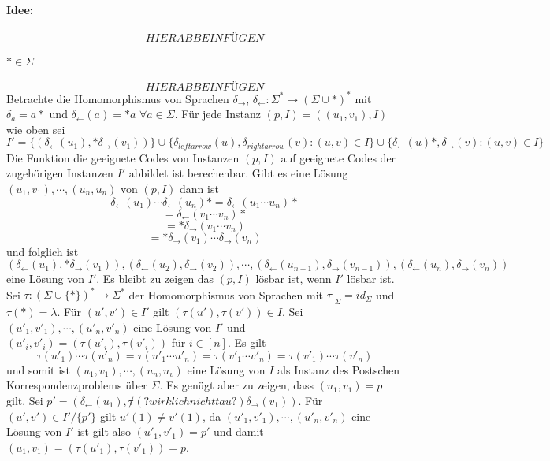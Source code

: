     \paragraph{Idee: }
    \[
    HIER ABB EINFÜGEN  
    \]

    \paragraph{\(* \in \Sigma\)}
    \[
    HIER ABB EINFÜGEN  
    \]
    Betrachte die Homomorphismus von Sprachen \(\delta_{\rightarrow}\), \(\delta_{\leftarrow} : \Sigma^* \rightarrow (\Sigma \cup {*})^*\) mit \(\delta_{a} = a*\) und \(\delta_{\leftarrow}(a) = *a\) \(\forall a \in \Sigma\). Für jede Instanz \((p, I) = ((u_1, v_1), I)\) wie oben sei \[I' = \{(\delta_{\leftarrow}(u_1), *\delta_{\rightarrow}(v_1))\} \cup \{\delta_{leftarrow}(u), \delta_{rightarrow}(v):  (u, v) \in I\} \cup \{\delta_{\leftarrow}(u)*, \delta_{\rightarrow}(v): (u, v) \in I\}\] Die Funktion die geeignete Codes von Instanzen \((p, I)\) auf geeignete Codes der zugehörigen Instanzen \(I'\) abbildet ist berechenbar. Gibt es eine Lösung \((u_1, v_1), \cdots, (u_n, u_n)\) von \((p,I)\) dann ist 
    \[
      \delta_{\leftarrow}(u_1)\cdots \delta_{\leftarrow}(u_n)* = \delta_{\leftarrow} (u_1 \cdots u_n)*
    \]
    \[
      = \delta_{\leftarrow}(v_1 \cdots v_n)*
    \] 
    \[
      = *\delta_{\rightarrow}(v_1 \cdots v_n)
    \]
    \[
      =*\delta_{\rightarrow}(v_1) \cdots \delta_{\rightarrow}(v_n)
    \]
    und folglich ist 
    \[
      (\delta_{\leftarrow}(u_1), *\delta_{\rightarrow}(v_1)), (\delta_{\leftarrow}(u_2), \delta_{\rightarrow}(v_2)), \cdots, (\delta_{\leftarrow}(u_{n-1}), \delta_{\rightarrow}(v_{n-1})), (\delta_{\leftarrow}(u_{n}), \delta_{\rightarrow}(v_{n}))
    \]
    eine Lösung von \(I'\). Es bleibt zu zeigen das \((p, I)\) lösbar ist, wenn \(I'\) lösbar ist. Sei \(\tau : (\Sigma \cup \{*\})^* \rightarrow \Sigma^*\) der Homomorphismus von Sprachen mit \(\tau \vert_{\Sigma} = id_{\Sigma}\) und \(\tau(*) = \lambda\). Für \((u', v') \in I'\) gilt \((\tau (u'), \tau(v')) \in I\). Sei \((u'_1, v'_1), \cdots, (u'_n, v'_n)\) eine Lösung von \(I'\) und \((u'_i, v'_i) = (\tau(u'_i), \tau(v'_i))\) für \(i \in [n]\). Es gilt \[\tau(u'_1) \cdots \tau(u'_n) = \tau(u'_1 \cdots u'_n) = \tau(v'_1 \cdots v'_n) = \tau(v'_1) \cdots \tau(v'_n)\] und somit ist \((u_1, v_1), \cdots, (u_n, u_v)\) eine Lösung von \(I\) als Instanz des Postschen Korrespondenzproblems über \(\Sigma\). Es genügt aber zu zeigen, dass \((u_1, v_1) = p \) gilt. Sei \(p' = (\delta_{\leftarrow} (u_1), \not \tau (?wirklich nicht tau?) \delta_{\rightarrow}(v_1))\). Für \((u', v') \in I' / \{p'\}\) gilt \(u'(1) \not = v'(1)\), da \((u'_1, v'_1), \cdots, (u'_n, v'_n)\) eine Lösung von \(I'\) ist gilt also \((u'_1, v'_1) = p'\) und damit \((u_1, v_1) = (\tau(u'_1), \tau(v'_1)) = p\).

